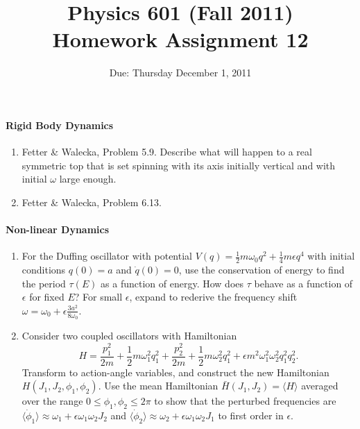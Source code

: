 \documentclass[letterpaper,11pt]{article}
\title{Physics 601 (Fall 2011) \\ Homework Assignment 12}
\date{Due: Thursday December 1, 2011}
\begin{document}
\maketitle

\paragraph*{Rigid Body Dynamics}
\begin{enumerate}
 \item Fetter \& Walecka, Problem 5.9.  Describe what will happen to a real symmetric top that is set spinning with its axis initially vertical and with initial $\omega$ large enough.
 \item Fetter \& Walecka, Problem 6.13.
\end{enumerate}

\paragraph*{Non-linear Dynamics}
\begin{enumerate}[resume]
 \item For the Duffing oscillator with potential $V(q) = \frac{1}{2} m \omega_0 q^2 + \frac{1}{4} m \epsilon q^4$ with initial conditions $q(0) = a$ and $\dot{q}(0) = 0$, use the conservation of energy to find the period $\tau(E)$ as a function of energy.  How does $\tau$ behave as a function of $\epsilon$ for fixed $E$?  For small $\epsilon$, expand to rederive the frequency shift $\omega = \omega_0 + \epsilon \frac{3a^2}{8\omega_0}$.
 \item Consider two coupled oscillators with Hamiltonian
 \begin{equation*}
  H = \frac{p_1^2}{2m} + \frac{1}{2} m \omega_1^2 q_1^2 + \frac{p_2^2}{2m} + \frac{1}{2} m \omega_2^2 q_1^2 + \epsilon m^2 \omega_1^2 \omega_2^2 q_1^2 q_2^2.
 \end{equation*}
 Transform to action-angle variables, and construct the new Hamiltonian $H(J_1, J_2, \phi_1, \phi_2)$.  Use the mean Hamiltonian $\bar{H}(J_1,J_2) = \langle H \rangle$ averaged over the range $0 \le \phi_1,\phi_2 \le 2\pi$ to show that the perturbed frequencies are $\langle \dot\phi_1 \rangle \approx \omega_1 + \epsilon \omega_1 \omega_2 J_2$ and $\langle \dot\phi_2 \rangle \approx \omega_2 + \epsilon \omega_1 \omega_2 J_1$ to first order in $\epsilon$.
\end{enumerate}
\end{document}
